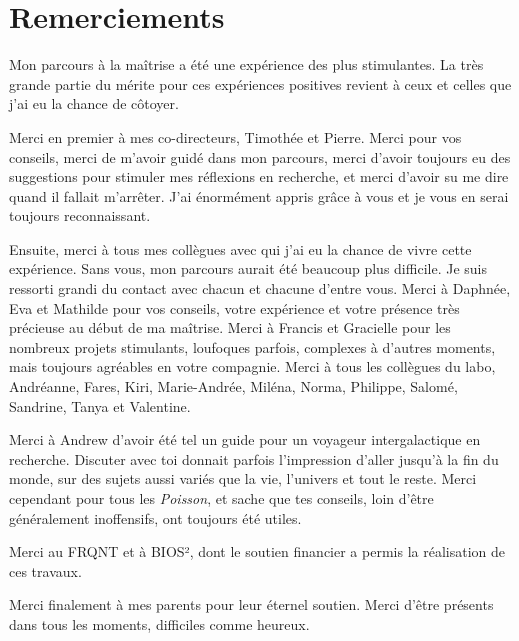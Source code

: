 \documentclass[12pt,twoside,maitrise]{template/dms}
\begin{document}
\chapter*{Remerciements}

Mon parcours à la maîtrise a été une expérience des plus stimulantes. La très grande partie du mérite pour ces expériences positives revient à ceux et celles que j’ai eu la chance de côtoyer.

Merci en premier à mes co-directeurs, Timothée et Pierre. Merci pour vos conseils, merci de m’avoir guidé dans mon parcours, merci d’avoir toujours eu des suggestions pour stimuler mes réflexions en recherche, et merci d’avoir su me dire quand il fallait m’arrêter. J’ai énormément appris grâce à vous et je vous en serai toujours reconnaissant.

Ensuite, merci à tous mes collègues avec qui j’ai eu la chance de vivre cette expérience. Sans vous, mon parcours aurait été beaucoup plus difficile. Je suis ressorti grandi du contact avec chacun et chacune d’entre vous. Merci à Daphnée, Eva et Mathilde pour vos conseils, votre expérience et votre présence très précieuse au début de ma maîtrise. Merci à Francis et Gracielle pour les nombreux projets stimulants, loufoques parfois, complexes à d’autres moments, mais toujours agréables en votre compagnie. Merci à tous les collègues du labo, Andréanne, Fares, Kiri, Marie-Andrée, Miléna, Norma, Philippe, Salomé, Sandrine, Tanya et Valentine.

Merci à Andrew d’avoir été tel un guide pour un voyageur intergalactique en recherche. Discuter avec toi donnait parfois l’impression d’aller jusqu’à la fin du monde, sur des sujets aussi variés que la vie, l’univers et tout le reste. Merci cependant pour tous les \textit{Poisson}, et sache que tes conseils, loin d’être généralement inoffensifs, ont toujours été utiles.

Merci au FRQNT et à BIOS², dont le soutien financier a permis la réalisation de ces travaux. 

Merci finalement à mes parents pour leur éternel soutien. Merci d’être présents dans tous les moments, difficiles comme heureux.


\NoChapterPageNumber
\cleardoublepage


\end{document}
